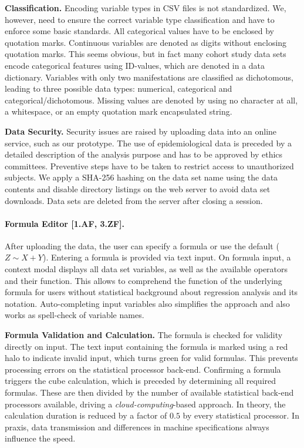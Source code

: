\documentclass[journal]{style/vgtc} 			          %
\begin{document}
\textbf{Classification.}
Encoding variable types in CSV files is not standardized.
We, however, need to ensure the correct variable type classification and have to enforce some basic standards.
All categorical values have to be enclosed by quotation marks.
Continuous variables are denoted as digits without enclosing quotation marks.
This seems obvious, but in fact many cohort study data sets encode categorical features using ID-values, which are denoted in a data dictionary.
Variables with only two manifestations are classified as dichotomous, leading to three possible data types: numerical, categorical and categorical/dichotomous.
Missing values are denoted by using no character at all, a whitespace, or an empty quotation mark encapsulated string.

\textbf{Data Security.}
Security issues are raised by uploading data into an online service, such as our prototype.
The use of epidemiological data is preceded by a detailed description of the analysis purpose and has to be approved by ethics committees.
Preventive steps have to be taken to restrict access to unauthorized subjects.
We apply a SHA-256 hashing on the data set name using the data contents and disable directory listings on the web server to avoid data set downloads.
Data sets are deleted from the server after closing a session.

\paragraph{Formula Editor [1.AF, 3.ZF].}
After uploading the data, the user can specify a formula or use the default ($Z \sim X + Y$).
Entering a formula is provided via text input.
On formula input, a context modal displays all data set variables, as well as the available operators and their function.
This allows to comprehend the function of the underlying formula for users without statistical background about regression analysis and its notation.
Auto-completing input variables also simplifies the approach and also works as spell-check of variable names.

\textbf{Formula Validation and Calculation.} The formula is checked for validity directly on input.
The text input containing the formula is marked using a red halo to indicate invalid input, which turns green for valid formulas.
This prevents processing errors on the statistical processor back-end.
Confirming a formula triggers the cube calculation, which is preceded by determining all required formulas.
These are then divided by the number of available statistical back-end processors available, driving a \emph{cloud-computing}-based approach.
In theory, the calculation duration is reduced by a factor of $0.5$ by every statistical processor.
In praxis, data transmission and differences in machine specifications always influence the speed.
\end{document}
